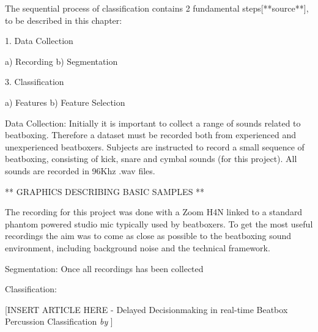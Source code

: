 The sequential process of classification contains 2 fundamental steps[**source**], to be described in this chapter: 

1.	Data Collection

	a)	Recording
	b)	Segmentation
	
3. Classification

	a)	Features
	b)	Feature Selection

Data Collection: 
Initially it is important to collect a range of sounds related to beatboxing. Therefore a dataset must be recorded both from experienced and unexperienced beatboxers. Subjects are instructed to record a small sequence of beatboxing, consisting of kick, snare and cymbal sounds (for this project). All sounds are recorded in 96Khz .wav files. 

** GRAPHICS DESCRIBING BASIC SAMPLES ** 

The recording for this project was done with a Zoom H4N linked to a standard phantom powered studio mic typically used by beatboxers. To get the most useful recordings the aim was to come as close as possible to the beatboxing sound environment, including background noise and the technical framework.


Segmentation:
Once all recordings has been collected

Classification: 





[INSERT ARTICLE HERE - Delayed Decisionmaking in real-time Beatbox Percussion Classification \textit{by} \citep{Stowell2010} ]
